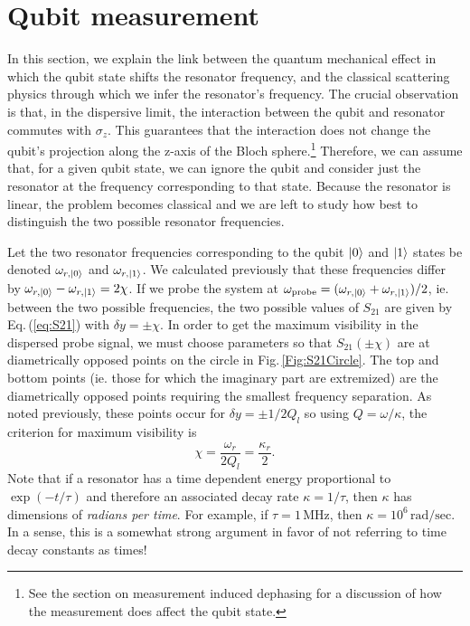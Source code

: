 \section{Qubit measurement}

In this section, we explain the link between the quantum mechanical effect in which the qubit state shifts the resonator frequency, and the classical scattering physics through which we infer the resonator's frequency.
The crucial observation is that, in the dispersive limit, the interaction between the qubit and resonator commutes with $\sigma_z$.
This guarantees that the interaction does not change the qubit's projection along the z-axis of the Bloch sphere.\footnote{See the section on measurement induced dephasing for a discussion of how the measurement does affect the qubit state.}
Therefore, we can assume that, for a given qubit state, we can ignore the qubit and consider just the resonator at the frequency corresponding to that state.
Because the resonator is linear, the problem becomes classical and we are left to study how best to distinguish the two possible resonator frequencies.

Let the two resonator frequencies corresponding to the qubit $| 0 \rangle$ and $| 1 \rangle$ states be denoted $\omega_{r,| 0 \rangle}$ and $\omega_{r,| 1 \rangle}$.
We calculated previously that these frequencies differ by $\omega_{r,| 0 \rangle} - \omega_{r,| 1 \rangle} = 2\chi$.
If we probe the system at $\omega_{\text{probe}} = (\omega_{r,| 0 \rangle} + \omega_{r,| 1 \rangle})/2$, ie. between the two possible frequencies, the two possible values of $S_{21}$ are given by Eq.\,(\ref{eq:S21}) with $\delta y = \pm \chi$.
In order to get the maximum visibility in the dispersed probe signal, we must choose parameters so that $S_{21}(\pm \chi)$ are at diametrically opposed points on the circle in Fig.\,\ref{Fig:S21Circle}.
The top and bottom points (ie. those for which the imaginary part are extremized) are the diametrically opposed points requiring the smallest frequency separation.
As noted previously, these points occur for $\delta y = \pm 1/2Q_l$ so using $Q = \omega / \kappa$, the criterion for maximum visibility is
\begin{equation}
\chi = \frac{\omega_r}{2Q_l} = \frac{\kappa_r}{2}. \label{eq:chiVsKappa_r}
\end{equation}
Note that if a resonator has a time dependent energy proportional to $\exp(-t/\tau)$ and therefore an associated decay rate $\kappa = 1/\tau$, then $\kappa$ has dimensions of \emph{radians per time}.
For example, if $\tau=1 \, \text{MHz}$, then $\kappa = 10^6 \, \text{rad}/\text{sec}$.
In a sense, this is a somewhat strong argument in favor of not referring to time decay constants as times!
